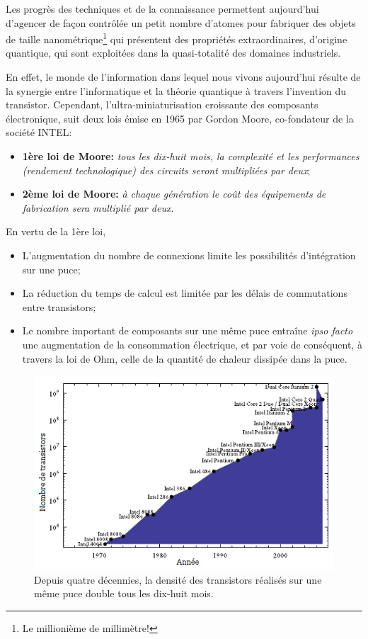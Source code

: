 \documentclass[12pt,a4paper,oneside,openany]{book}%
\numberwithin{equation}{section}
\numberwithin{figure}{section}
\numberwithin{table}{section}
\begin{document}
Les progrès des techniques et de la connaissance permettent aujourd'hui
d'agencer de façon contrôlée un petit nombre d'atomes pour fabriquer des
objets de taille nanométrique\footnote{Le millionième de millimètre!} qui
présentent des propriétés extraordinaires, d'origine quantique, qui sont
exploitées dans la quasi-totalité des domaines industriels.

En effet, le monde de l'information dans lequel nous vivons aujourd'hui résulte
de la synergie entre l'informatique et la théorie quantique à travers
l'invention du transistor. Cependant, l'ultra-miniaturisation croissante des
composants électronique, suit deux lois émise en 1965 par Gordon Moore,
co-fondateur de la société INTEL:
\begin{itemize}
  \item\textbf{1ère loi de Moore:} \emph{tous les dix-huit mois, la complexité
et les performances (rendement technologique) des circuits seront multipliées
par deux};
  \item\textbf{2ème loi de Moore:} \emph{à chaque génération le coût des
équipements de fabrication sera multiplié par deux}.
\end{itemize}

En vertu de la 1ère loi,
\begin{itemize}
  \item L'augmentation du nombre de connexions limite les possibilités
d'intégration sur une puce;
  \item La réduction du temps de calcul est limitée par les délais de
commutations entre transistors;
  \item Le nombre important de composants sur une même puce entraîne \emph{ipso
facto} une augmentation de la consommation électrique, et par voie de
conséquent, à travers la loi de Ohm, celle de la quantité de chaleur dissipée
dans la puce.
\end{itemize}

\begin{figure}[ptbh]
\centering
  \includegraphics{graphics/LoiMoore.png}
\caption{Depuis quatre décennies, la densité des transistors réalisés sur une
même puce double tous les dix-huit mois.}
\label{fig:LoiMoore}
\end{figure}
\end{document}
